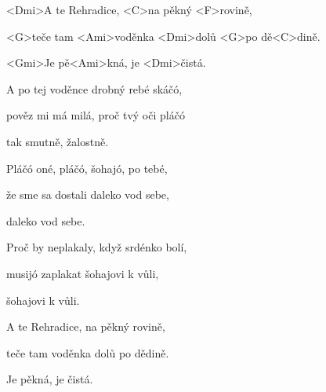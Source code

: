 

\zs
<Dmi>A te Rehradice, <C>na pěkný <F>rovině,

<G>teče tam <Ami>voděnka <Dmi>dolů <G>po dě<C>dině.

<Gmi>Je pě<Ami>kná, je <Dmi>čistá.
\ks

\zs
A po tej voděnce drobný rebé skáčó,

pověz mi má milá, proč tvý oči pláčó

tak smutně, žalostně.
\ks

\zs
Pláčó oné, pláčó, šohajó, po tebé,

že sme sa dostali daleko vod sebe,

daleko vod sebe.
\ks

\zs
Proč by neplakaly, když srdénko bolí,

musijó zaplakat šohajovi k vůli,

šohajovi k vůli.
\ks

\zs
A te Rehradice, na pěkný rovině,

teče tam voděnka dolů po dědině.

Je pěkná, je čistá.
\ks

\kp























